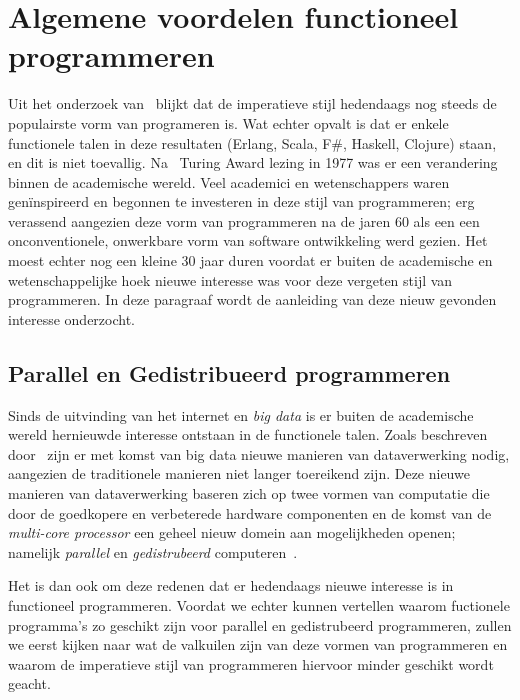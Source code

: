 \documentclass[twoside,twocolumn]{article}
\begin{document}
\section{Algemene voordelen functioneel programmeren}
\label{sec:3}

Uit het onderzoek van~\textcites{src7}{src8} blijkt dat de imperatieve stijl
hedendaags nog steeds de populairste vorm van programeren is. Wat echter opvalt
is dat er enkele functionele talen in deze resultaten (Erlang,
Scala, F#, Haskell, Clojure) staan, en dit is niet toevallig.
Na~\textcite{src9} Turing Award lezing in 1977 was er een verandering binnen de
academische wereld. Veel academici en wetenschappers waren gen\"inspireerd en
begonnen te investeren in deze stijl van programmeren; erg verassend aangezien
deze vorm van programmeren na de jaren 60 als een een onconventionele,
onwerkbare vorm van software ontwikkeling werd gezien. Het moest echter nog een
kleine 30 jaar duren voordat er buiten de academische en wetenschappelijke hoek
nieuwe interesse was voor deze vergeten stijl van programmeren. In deze
paragraaf wordt de aanleiding van deze nieuw gevonden interesse onderzocht.

\subsection{Parallel en Gedistribueerd programmeren}
\label{subsec:3-1}

Sinds de uitvinding van het internet en \textit{big data} is er buiten de
academische wereld hernieuwde interesse ontstaan in de functionele talen.
Zoals beschreven door~\textcite{src10} zijn er met komst van big data
nieuwe manieren van dataverwerking nodig, aangezien de traditionele manieren
niet langer toereikend zijn. Deze nieuwe manieren van dataverwerking baseren
zich op twee vormen van computatie die door de goedkopere en verbeterede
hardware componenten en de komst van de \textit{multi-core processor} een
geheel nieuw domein aan mogelijkheden openen; namelijk \textit{parallel} en
\textit{gedistrubeerd} computeren~\cite{src10,src11}.

Het is dan ook om deze redenen dat er hedendaags nieuwe interesse is in
functioneel programmeren. Voordat we echter kunnen vertellen waarom
fuctionele programma's zo geschikt zijn voor parallel en gedistrubeerd
programmeren, zullen we eerst kijken naar wat de valkuilen zijn van deze
vormen van programmeren en waarom de imperatieve stijl van programmeren
hiervoor minder geschikt wordt geacht.
\end{document}
